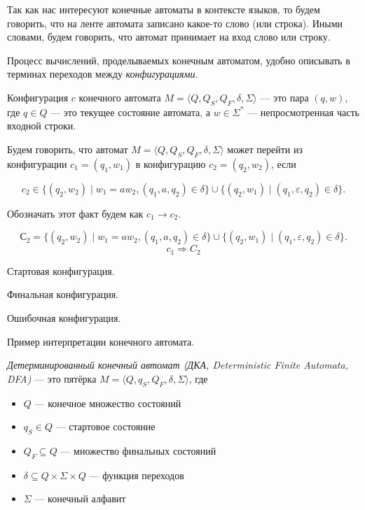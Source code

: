 Так как нас интересуют конечные автоматы в контексте языков, то будем говорить, что на ленте автомата записано какое-то слово (или строка).
Иными словами, будем говорить, что автомат принимает на вход слово или строку.


Процесс вычислений, проделываемых конечным автоматом, удобно описывать в терминах переходов между \textit{конфигурациями}.

\begin{definition}
    Конфигурация $c$ конечного автомата $M = \langle Q, Q_S, Q_F, \delta, \Sigma \rangle$ --- это пара $(q,w)$, где $q\in Q$ --- это текущее состояние автомата, а $w \in \Sigma^*$ --- непросмотренная часть входной строки.
\end{definition}

\begin{definition}
    Будем говорить, что автомат $M = \langle Q, Q_S, Q_F, \delta, \Sigma \rangle$ может перейти из конфигурации $c_1 = (q_1,w_1)$ в конфигурацию $c_2 = (q_2,w_2)$, если     
        
    $$c_2 \in \{(q_2,w_2) \mid w_1 = aw_2, (q_1,a, q_2) \in \delta\} \cup \{(q_2,w_1) \mid (q_1, \varepsilon, q_2) \in \delta\}.$$

    Обозначать этот факт будем как $c_1 \to c_2$.
\end{definition}

$$С_2 = \{(q_2,w_2) \mid w_1 = aw_2, (q_1,a, q_2) \in \delta\} \cup \{(q_2,w_1) \mid (q_1, \varepsilon, q_2) \in \delta\}.$$
$$ c_1 \Rightarrow C_2 $$

Стартовая конфигурация.

Финальная конфигурация.

Ошибочная конфигурация.

\begin{example}
    Пример интерпретации конечного автомата.
\end{example}
    

\begin{definition}\label{def:DeterminicticFiniteAutomata}
    \textit{Детерминированный конечный автомат (ДКА, Deterministic Finite Automata, DFA)} --- это пятёрка $M = \langle Q, q_S, Q_F, \delta, \Sigma \rangle$, где
    \begin{itemize}
        \item $Q$ --- конечное множество состояний
        \item $q_S \in Q$ --- стартовое состояние
        \item $Q_F \subseteq Q$ --- множество финальных состояний
        \item $\delta \subseteq Q \times \Sigma \times Q$ --- функция переходов
        \item $\Sigma$ --- конечный алфавит
    \end{itemize}
\end{definition}


